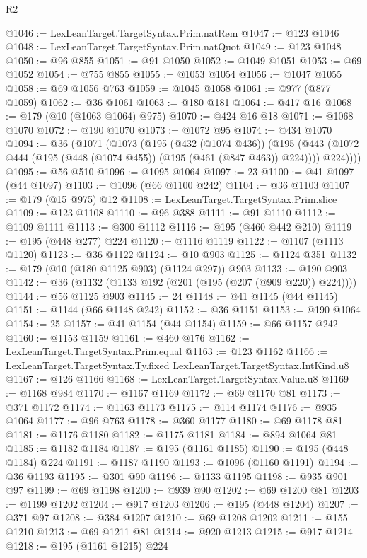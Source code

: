 \begin{lexlean}{R2}
\begin{coremodule}
{{{{{{{{{{{{{{{{{{{{{{{{{{{{{{{{{{{{{{{{{{{{{{@1046 := LexLeanTarget.TargetSyntax.Prim.natRem
@1047 := @123 @1046
@1048 := LexLeanTarget.TargetSyntax.Prim.natQuot
@1049 := @123 @1048
@1050 := @96 @855
@1051 := @91 @1050
@1052 := @1049 @1051
@1053 := @69 @1052
@1054 := @755 @855
@1055 := @1053 @1054
@1056 := @1047 @1055
@1058 := @69 @1056 @763
@1059 := @1045 @1058
@1061 := @977 (@877 @1059)
@1062 := @36 @1061
@1063 := @180 @181
@1064 := @417 @16
@1068 := @179 (@10 (@1063 @1064) @975)
@1070 := @424 @16 @18
@1071 := @1068 @1070
@1072 := @190 @1070
@1073 := @1072 @95
@1074 := @434 @1070
@1094 := @36
    (@1071
      (@1073
        (@195
          (@432 (@1074 @436))
          (@195
            (@443 (@1072 @444 (@195 (@448 (@1074 @455)) (@195 (@461 (@847 @463)) @224))))
            @224))))
@1095 := @56 @510
@1096 := @1095 @1064
@1097 := 23
@1100 := @41 @1097 (@44 @1097)
@1103 := @1096 (@66 @1100 @242)
@1104 := @36 @1103
@1107 := @179 (@15 @975) @12
@1108 := LexLeanTarget.TargetSyntax.Prim.slice
@1109 := @123 @1108
@1110 := @96 @388
@1111 := @91 @1110
@1112 := @1109 @1111
@1113 := @300 @1112
@1116 := @195 (@460 @442 @210)
@1119 := @195 (@448 @277) @224
@1120 := @1116 @1119
@1122 := @1107 (@1113 @1120)
@1123 := @36 @1122
@1124 := @10 @903
@1125 := @1124 @351
@1132 := @179 (@10 (@180 @1125 @903) (@1124 @297)) @903
@1133 := @190 @903
@1142 := @36 (@1132 (@1133 @192 (@201 (@195 (@207 (@909 @220)) @224))))
@1144 := @56 @1125 @903
@1145 := 24
@1148 := @41 @1145 (@44 @1145)
@1151 := @1144 (@66 @1148 @242)
@1152 := @36 @1151
@1153 := @190 @1064
@1154 := 25
@1157 := @41 @1154 (@44 @1154)
@1159 := @66 @1157 @242
@1160 := @1153 @1159
@1161 := @460 @176
@1162 := LexLeanTarget.TargetSyntax.Prim.equal
@1163 := @123 @1162
@1166 := LexLeanTarget.TargetSyntax.Ty.fixed LexLeanTarget.TargetSyntax.IntKind.u8
@1167 := @126 @1166
@1168 := LexLeanTarget.TargetSyntax.Value.u8
@1169 := @1168 @984
@1170 := @1167 @1169
@1172 := @69 @1170 @81
@1173 := @371 @1172
@1174 := @1163 @1173
@1175 := @114 @1174
@1176 := @935 @1064
@1177 := @96 @763
@1178 := @360 @1177
@1180 := @69 @1178 @81
@1181 := @1176 @1180
@1182 := @1175 @1181
@1184 := @894 @1064 @81
@1185 := @1182 @1184
@1187 := @195 (@1161 @1185)
@1190 := @195 (@448 @1184) @224
@1191 := @1187 @1190
@1193 := @1096 (@1160 @1191)
@1194 := @36 @1193
@1195 := @301 @90
@1196 := @1133 @1195
@1198 := @935 @901 @97
@1199 := @69 @1198
@1200 := @939 @90
@1202 := @69 @1200 @81
@1203 := @1199 @1202
@1204 := @917 @1203
@1206 := @195 (@448 @1204)
@1207 := @371 @97
@1208 := @384 @1207
@1210 := @69 @1208 @1202
@1211 := @155 @1210
@1213 := @69 @1211 @81
@1214 := @920 @1213
@1215 := @917 @1214
@1218 := @195 (@1161 @1215) @224
}}}}}}}}}}}}}}}}}}}}}}}}}}}}}}}}}}}}}}}}}}}}}}
\end{coremodule}
\end{lexlean}
